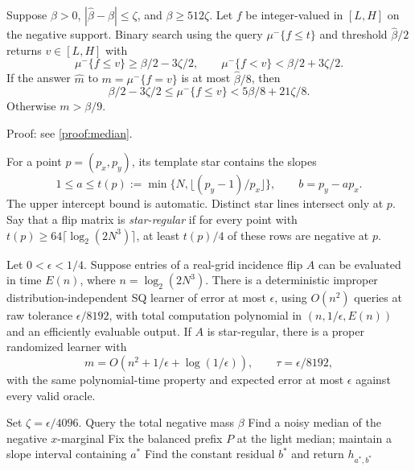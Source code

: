 \begin{lemma}\label{lem:median}
Suppose $\beta>0$, $|\widehat\beta-\beta|\le\zeta$, and $\beta\ge512\zeta$. Let $f$ be integer-valued in $[L,H]$ on the negative support. Binary search using the query $\mu^-\{f\le t\}$ and threshold $\widehat\beta/2$ returns $v\in[L,H]$ with
\[
 \mu^-\{f\le v\}\ge\beta/2-3\zeta/2,
 \qquad
 \mu^-\{f<v\}<\beta/2+3\zeta/2.
\]
If the answer $\widehat m$ to $m=\mu^-\{f=v\}$ is at most $\widehat\beta/8$, then
\begin{equation}\label{eq:balancedmedian}
 \beta/2-3\zeta/2\le\mu^-\{f\le v\}
 <5\beta/8+21\zeta/8.
\end{equation}
Otherwise $m>\beta/9$.
\end{lemma}

\noindent Proof: see \cref{proof:median}.\par


For a point $p=(p_x,p_y)$, its template star contains the slopes
\[
 1\le a\le t(p):=\min\{N,\lfloor(p_y-1)/p_x\rfloor\},
 \qquad b=p_y-ap_x.
\]
The upper intercept bound is automatic. Distinct star lines intersect only at $p$. Say that a flip matrix is \emph{star-regular} if for every point with $t(p)\ge64\lceil\log_2(2N^3)\rceil$, at least $t(p)/4$ of these rows are negative at $p$.


\begin{theorem}\label{thm:fast}
Let $0<\epsilon<1/4$. Suppose entries of a real-grid incidence flip $A$ can be evaluated in time $E(n)$, where $n=\log_2(2N^3)$. There is a deterministic improper distribution-independent SQ learner of error at most $\epsilon$, using $O(n^2)$ queries at raw tolerance $\epsilon/8192$, with total computation polynomial in $(n,1/\epsilon,E(n))$ and an efficiently evaluable output. If $A$ is star-regular, there is a proper randomized learner with
\[
 m=O(n^2+1/\epsilon+\log(1/\epsilon)),\qquad
 \tau=\epsilon/8192,
\]
with the same polynomial-time property and expected error at most $\epsilon$ against every valid oracle.
\end{theorem}


\begin{algorithm}[t]
\caption{Order-median learner}\label{alg:median}
Set $\zeta=\epsilon/4096$. Query the total negative mass $\beta$\;
Find a noisy median of the negative $x$-marginal\;
Fix the balanced prefix $P$ at the light median; maintain a slope interval containing $a^*$\;
Find the constant residual $b^*$ and return $h_{a^*,b^*}$\;
\end{algorithm}
